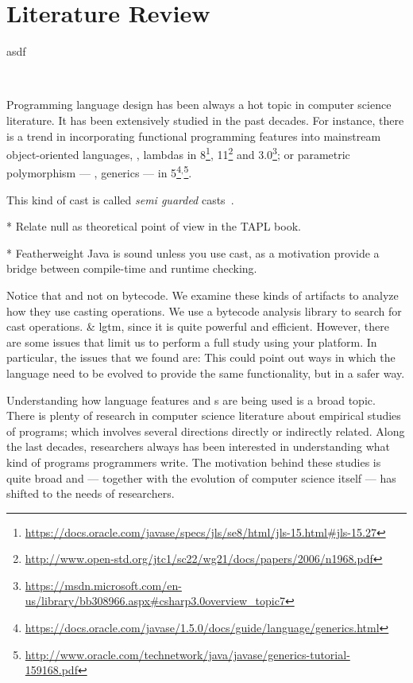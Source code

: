
\chapter{Literature Review}

\label{cha:literature-review}

asdf
\ql{}~\cite{schafer_algebraic_2017}




\ql{}~\cite{schafer_algebraic_2017}

\cite{avgustinov_ql:_2016}



Programming language design has been always a hot topic in computer science literature.
It has been extensively studied in the past decades.
For instance, there is a trend in incorporating functional programming features into mainstream object-oriented languages, \eg, lambdas in \java{} 8\footnote{\url{https://docs.oracle.com/javase/specs/jls/se8/html/jls-15.html\#jls-15.27}}, \cpp{}11\footnote{\url{http://www.open-std.org/jtc1/sc22/wg21/docs/papers/2006/n1968.pdf}} and \cs{} 3.0\footnote{\url{https://msdn.microsoft.com/en-us/library/bb308966.aspx\#csharp3.0overview\_topic7}}; or parametric polymorphism --- \ie{}, generics --- in \java{} 5\footnote{\url{https://docs.oracle.com/javase/1.5.0/docs/guide/language/generics.html}}\(^{,}\)\footnote{\url{http://www.oracle.com/technetwork/java/javase/generics-tutorial-159168.pdf}}.






This kind of cast is called \emph{semi guarded} casts~\cite{winther_guarded_2011}.

* Relate null as theoretical point of view in the TAPL book.

* Featherweight Java is sound unless you use cast, as a motivation
provide a bridge between compile-time and runtime checking. 

Notice that 
and not on bytecode.
We examine these kinds of artifacts to analyze how they use casting operations. 
We use a bytecode analysis library to search for cast operations.
\& lgtm, since it is quite powerful and efficient.
However, there are some issues that limit us to perform a full study using your platform.
In particular, the issues that we found are:
This could point out ways in which the \java{} language need to be evolved to provide the same functionality, but in a safer way.

Understanding how language features and \api{}s are being used is a
broad topic.
There is plenty of research in computer science literature about
empirical studies of programs;
which involves several directions directly or indirectly related.
Along the last decades, researchers always has been interested in
understanding what kind of programs programmers write.
The motivation behind these studies is quite broad and ---
together with the evolution of computer science itself ---
has shifted to the needs of researchers.

